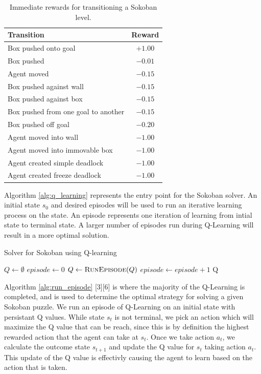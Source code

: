 \documentclass[times, 10pt,twocolumn]{article}
\begin{document}
\begin{table}[htbp]
  \centering
  \begin{tabular}{l c} \hline\hline
    Transition & Reward \\ \hline
    Box pushed onto goal & $+1.00$ \\
    Box pushed & $-0.01$ \\
    Agent moved & $-0.15$ \\
    Box pushed against wall & $-0.15$ \\
    Box pushed against box & $-0.15$ \\
    Box pushed from one goal to another & $-0.15$ \\
    Box pushed off goal & $-0.20$ \\ 
    Agent moved into wall & $-1.00$ \\
    Agent moved into immovable box & $-1.00$ \\
    Agent created simple deadlock & $-1.00$ \\
    Agent created freeze deadlock & $-1.00$ \\ \hline\hline
  \end{tabular}
  \caption{Immediate rewards for transitioning a Sokoban level.}
  \label{table:rewards}
\end{table}


Algorithm \ref{alg:q_learning} represents the entry point for the Sokoban solver.  An initial state $s_0$ and desired episodes will be used to run an iterative learning process on the state.  An episode represents one iteration of learning from intial state to terminal state.  A larger number of episodes run during Q-Learning will result in a more optimal solution.

\begin{algorithm}
  \caption{Solver for Sokoban using Q-learning}
  \begin{algorithmic}[1]
      \State $Q\gets \emptyset$
      \State $episode\gets 0$
        \State $Q\gets \Call{RunEpisode}{Q}$
        \State $episode\gets episode + 1$
      \EndWhile
      \State \Return Q
    \EndFunction
  \end{algorithmic}
\label{alg:q_learning}
\end{algorithm}

Algorithm \ref{alg:run_episode} [3][6] is where the majority of the Q-Learning is completed, and is used to determine the optimal strategy for solving a given Sokoban puzzle.  We run an episode of Q-Learning on an initial state with persistant Q values.  While state $s_t$ is not terminal, we pick an action which will maximize the Q value that can be reach, since this is by definition the highest rewarded action that the agent can take at $s_t$.  Once we take action $a_t$, we calculate the outcome state $s_{t+1}$ and update the Q value for $s_t$ taking action $a_t$.  This update of the Q value is effectivly causing the agent to learn based on the action that is taken.
\end{document}
